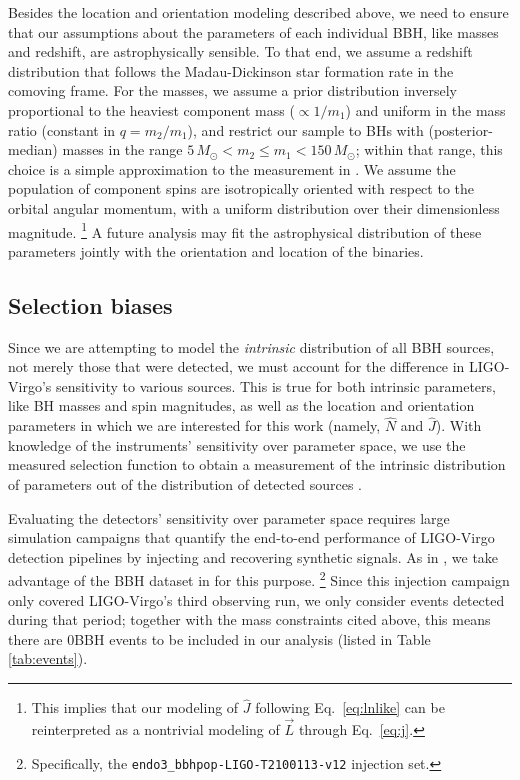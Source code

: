 \documentclass[aps,prd,twocolumn,superscriptaddress,preprintnumbers,floatfix,nofootinbib]{revtex4-2}
\newcommand{\Nevents}{0}
\begin{document}
Besides the location and orientation modeling described above, we need to ensure that our assumptions about the parameters of each individual \ac{BBH}, like masses and redshift, are astrophysically sensible.
To that end, we assume a redshift distribution that follows the Madau-Dickinson star formation rate \cite{Madau:2014bja} in the comoving frame.
For the masses, we assume a prior distribution inversely proportional to the heaviest component mass ($\propto 1/m_1$) and uniform in the mass ratio (constant in $q = m_2/m_1$), and restrict our sample to \acp{BH} with (posterior-median) masses in the range $5 \, M_\odot < m_2 \leq m_1 < 150 \, M_\odot$; within that range, this choice is a simple approximation to the measurement in \cite{LIGOScientific:2021psn}.
We assume the population of component spins are isotropically oriented with respect to the orbital angular momentum, with a uniform distribution over their dimensionless magnitude.%
\footnote{This implies that our modeling of $\hat{J}$ following Eq.~\eqref{eq:lnlike} can be reinterpreted as a nontrivial modeling of $\vec{L}$ through Eq.~\eqref{eq:j}.}
A future analysis may fit the astrophysical distribution of these parameters jointly with the orientation and location of the binaries. 


\subsection{Selection biases}
\label{sec:selection}

Since we are attempting to model the \emph{intrinsic} distribution of all \ac{BBH} sources, not merely those that were detected, we must account for the difference in LIGO-Virgo's sensitivity to various sources.
This is true for both intrinsic parameters, like \ac{BH} masses and spin magnitudes, as well as the location and orientation parameters in which we are interested for this work (namely, $\hat{N}$ and $\hat{J}$).
With knowledge of the instruments' sensitivity over parameter space, we use the measured selection function to obtain a measurement of the intrinsic distribution of parameters out of the distribution of detected sources \cite{Loredo:2004nn,Mandel:2018mve}.

Evaluating the detectors' sensitivity over parameter space requires large simulation campaigns that quantify the end-to-end performance of LIGO-Virgo detection pipelines by injecting and recovering synthetic signals.
As in \cite{Essick:2022slj}, we take advantage of the \ac{BBH} dataset in \cite{o3-selection} for this purpose.%
\footnote{Specifically, the \texttt{endo3\_bbhpop-LIGO-T2100113-v12} injection set.}
Since this injection campaign only covered LIGO-Virgo's third observing run, we only consider events detected during that period; together with the mass constraints cited above, this means there are \Nevents \ac{BBH} events to be included in our analysis (listed in Table \ref{tab:events}). 
\end{document}
